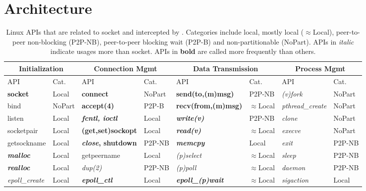 \section{Architecture}
\label{sec:architecture}


\begin{table}[t]
	\centering
	\begin{tabular}{ll|ll|ll|ll}
		\hline
		\multicolumn{2}{c|}{Initialization} &
		\multicolumn{2}{c|}{Connection Mgmt} &
		\multicolumn{2}{c|}{Data Transmission} &
		\multicolumn{2}{c}{Process Mgmt} \\
		\hline
		API & Cat. &
		API & Cat. &
		API & Cat. &
		API & Cat. \\
		\hline
		\hline
		\textbf{socket} & Local &
		\textbf{connect} & NoPart &
		\textbf{send(to,(m)msg)} & P2P-NB &
		\textit{(v)fork} & NoPart \\
		\hline
		bind & NoPart &
		\textbf{accept(4)} & P2P-B &
		\textbf{recv(from,(m)msg)} & $\approx$Local &
		\textit{pthread\_create} & NoPart \\
		\hline
		listen & Local &
		\textbf{\textit{fcntl, ioctl}} & Local &
		\textbf{\textit{write(v)}} & P2P-NB &
		\textit{clone} & NoPart \\
		\hline
		socketpair & Local &
		\textbf{(get,set)sockopt} & Local &
		\textbf{\textit{read(v)}} & $\approx$Local &
		\textit{execve} & NoPart \\
		\hline
		getsockname  & Local &
		\textbf{\textit{close}, shutdown} & P2P-NB &
		\textbf{\textit{memcpy}} & Local &
		\textit{exit} & P2P-NB \\
		\hline
		\textbf{\textit{malloc}} & Local &
		getpeername & Local &
		\textit{(p)select} & $\approx$Local &
		\textit{sleep} & P2P-NB \\
		\hline
		\textbf{\textit{realloc}} & Local &
		\textit{dup(2)} & P2P-NB &
		\textit{(p)poll} & $\approx$Local &
		\textit{daemon} & P2P-NB \\
		\hline
		\textit{epoll\_create} & Local &
		\textbf{\textit{epoll\_ctl}} & Local &
		\textbf{\textit{epoll\_(p)wait}} & $\approx$Local &
		\textit{sigaction} & Local \\
		\hline
	\end{tabular}
	\caption{Linux APIs that are related to socket and intercepted by \libipc{}. Categories include local, mostly local ($\approx$Local), peer-to-peer non-blocking (P2P-NB), peer-to-peer blocking wait (P2P-B) and non-partitionable (NoPart). APIs in \textit{italic} indicate usages more than socket. APIs in \textbf{bold} are called more frequently than others.}
	\label{tab:socket-api}
\end{table}

